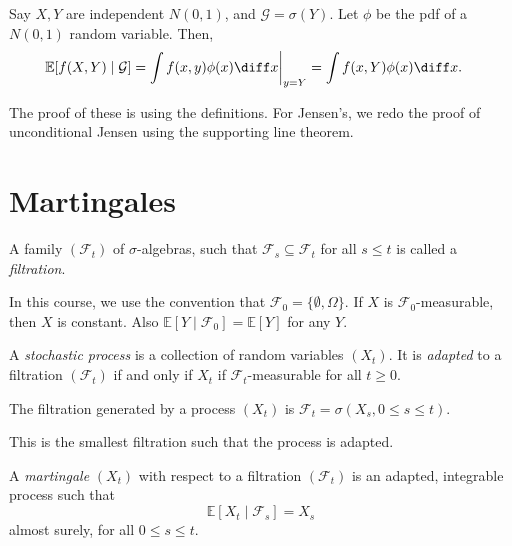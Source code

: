 \documentclass[12pt]{article}
\begin{document}
\begin{exbox}
	Say $X, Y$ are independent $N(0, 1)$, and $\mathcal{G} = \sigma(Y)$. Let $\phi$ be the pdf of a $N(0, 1)$ random variable. Then,
	\begin{align*}
		\mathbb{E}[f(X, Y) \mid \mathcal{G}] &= \int f(x, y) \phi(x) \diff x \biggr|_{y = Y} = \int f(x, Y) \phi(x) \diff x.
	\end{align*}
\end{exbox}

The proof of these is using the definitions. For Jensen's, we redo the proof of unconditional Jensen using the supporting line theorem.

\newpage

\section{Martingales}
\label{sec:mart}

\begin{definition}
	A family $(\mathcal{F}_t)$ of $\sigma$-algebras, such that $\mathcal{F}_s \subseteq \mathcal{F}_t$ for all $s \leq t$ is called a \emph{filtration}.
\end{definition}

In this course, we use the convention that $\mathcal{F}_0 = \{\emptyset, \Omega\}$. If $X$ is $\mathcal{F}_0$-measurable, then $X$ is constant. Also $\mathbb{E}[Y \mid \mathcal{F}_0] = \mathbb{E}[Y]$ for any $Y$.

\begin{definition}
	A \emph{stochastic process} is a collection of random variables $(X_t)$. It is \emph{adapted} to a filtration $(\mathcal{F}_t)$ if and only if $X_t$ if $\mathcal{F}_t$-measurable for all $t \geq 0$.
\end{definition}

\begin{definition}
	The filtration generated by a process $(X_t)$ is $\mathcal{F}_t = \sigma(X_s, 0 \leq s \leq t)$.
\end{definition}

This is the smallest filtration such that the process is adapted.

\begin{definition}
	A \emph{martingale} $(X_t)$ with respect to a filtration $(\mathcal{F}_t)$ is an adapted, integrable process such that
	\[
	\mathbb{E}[X_t \mid \mathcal{F}_s] = X_s
	\]
	almost surely, for all $0 \leq s \leq t$.
\end{definition}
\end{document}
